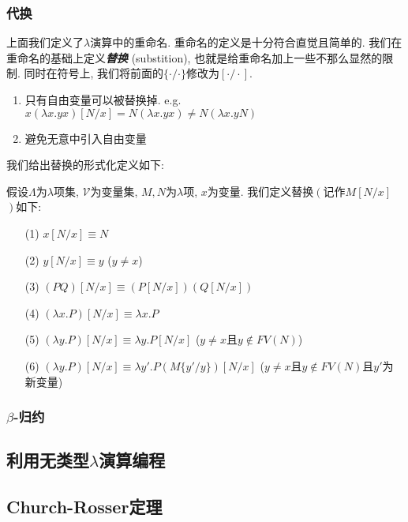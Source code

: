 \subsubsection{代换}
上面我们定义了$\lambda$演算中的重命名. 重命名的定义是十分符合直觉且简单的. 我们在重命名的基础上定义\textbf{\textit{替换}} (substition), 也就是给重命名加上一些不那么显然的限制. 同时在符号上, 我们将前面的$\{\cdot/\cdot\}$修改为$[\cdot/\cdot]$.
\begin{enumerate}
    \item 只有自由变量可以被替换掉. e.g. $x(\lambda x.yx)[N/x]=N (\lambda x.yx) \not= N (\lambda x.yN) $
    \item 避免无意中引入自由变量
\end{enumerate}
我们给出替换的形式化定义如下:
\begin{definition}
    假设$\Lambda$为$\lambda$项集, $\mathcal V$为变量集, $M, N$为$\lambda$项, $x$为变量. 我们定义替换$\left(\right.$记作$M[N/x]$ $\left.\right)$如下:
    \begin{enumerate}\normalfont{}
        \item[(1)] $x[N/x]\equiv N$
        \item[(2)] $y[N/x]\equiv y$ ($y\not=x$)
        \item[(3)] $(PQ)[N/x]\equiv(P[N/x])(Q[N/x])$
        \item[(4)] $(\lambda x.P)[N/x]\equiv\lambda x.P$
        \item[(5)] $(\lambda y.P)[N/x]\equiv\lambda y.P[N/x]$ ($y\not=x$且$y\not\in FV(N)$)
        \item[(6)] $(\lambda y.P)[N/x]\equiv\lambda y'.P(M\{y'/y\})[N/x]$ ($y\not=x$且$y\not\in FV(N)$且$y'$为新变量)
    \end{enumerate}
\end{definition}    

\subsubsection{\texorpdfstring{$\beta$}{beta}-归约}

\subsection{利用无类型\texorpdfstring{$\lambda$}{lambda}演算编程}

\subsection{\textbf{Church-Rosser}定理}